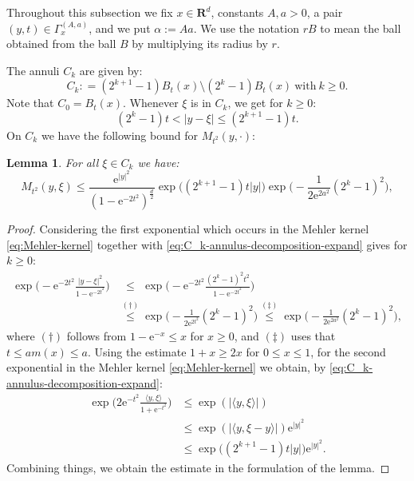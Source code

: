 \documentclass{amsart}
\newtheorem{lemma}{Lemma}
\theoremstyle{remark}
\newcommand{\la}{\langle}
\newcommand{\ra}{\rangle}
\renewcommand{\leq}{\leqslant}
\renewcommand{\leq}{\leqslant}
\renewcommand{\geq}{\geqslant}
\newcommand{\R}{\mathbf R}
\newcommand{\e}{\mathrm{e}} %
\renewcommand{\leq}{\leqslant}%
\renewcommand{\geq}{\geqslant}%
\begin{document}
Throughout this subsection we fix $x\in \R^d$, constants $A,a>0$, a pair
$(y,t)\in \Gamma_x^{(A,a)}$, and we put $\alpha:=Aa$. 
We use the notation $rB$ to mean the ball obtained from the ball $B$ by
multiplying its radius by $r$.

The annuli $C_k$ are given by:
\begin{equation}
  \label{eq:C_k-annulus-decomposition}
  C_k : = (2^{k + 1} - 1)B_t(x) \setminus (2^k - 1)B_t(x)
  \:\text{with}\: k \geq 0.
\end{equation}
Note that $C_0 = B_t(x)$. Whenever $\xi$ is in $C_k$, we get for $k
\geq 0$:
\begin{equation}
  \label{eq:C_k-annulus-decomposition-expand}
  (2^k - 1) t < |y - \xi| \leq (2^{k + 1} - 1) t.
\end{equation}
On $C_k$ we have the following bound for $M_{t^2}(y,\cdot)$:
\begin{lemma}\label{lem:On-diagonal-kernel-estimates-on-Ck}
  For all $\xi \in C_k$ we have:
  \begin{equation}
    M_{t^2}(y, \xi) \leq \frac{\e^{|y|^2}}{(1 - \e^{-2t^2})^{\frac{d}2}}
    \exp\bigl((2^{k + 1} - 1) t |y| \bigr) \exp\Big(\!-\!\frac1{2 \e^{2 a^2}} (2^k - 1)^2 \Big),
  \end{equation}
\end{lemma}
\begin{proof}
  Considering the first exponential which occurs in the Mehler kernel
  \eqref{eq:Mehler-kernel} together with
  \eqref{eq:C_k-annulus-decomposition-expand} gives for $k \geq 0$:
  \begin{align*}
    \exp\biggl(-\e^{-2t^2} \frac{|y - \xi|^2}{1 - \e^{-2t^2}} \biggr)
    &\overset{\phantom{(\dagger)}}{\leq} \exp\biggl(-\e^{-2t^2} \frac{(2^k - 1)^2 t^2}{1 - \e^{-2t^2}} \biggr)\\
    &\overset{(\dagger)}{\leq} \exp\biggl(-\frac1{2 \e^{2t^2}} (2^k - 1)^2 \biggr)
    \overset{(\ddagger)}{\leq} \exp\biggl(-\frac1{2 \e^{2a^2}} (2^k - 1)^2 \biggr),
  \end{align*}
  where $(\dagger)$ follows from $1 - \e^{-x} \leq x$ for $x \geq 0$, and $(\ddagger)$
  uses that $t \leq am(x) \leq a$. Using the estimate $1+x \geq 2x$ for $0 \leq
  x \leq 1$, for the second exponential in the Mehler kernel
  \eqref{eq:Mehler-kernel} we obtain, by
  \eqref{eq:C_k-annulus-decomposition-expand}:
  \begin{align*}
    \exp\biggl(2\e^{-t^2} \frac{\la y, \xi \ra}{1 + \e^{- t^2}} \biggr)
    & \leq \exp(|\la y, \xi \ra|)\\
    & \leq \exp(|\langle y, \xi-y\rangle|) \e^{|y|^2}\\
    & \leq \exp\bigl((2^{k + 1} - 1) t |y| \bigr) \e^{|y|^2}.
  \end{align*}
  Combining things, we obtain the estimate in the formulation of the lemma.
\end{proof}
\end{document}
